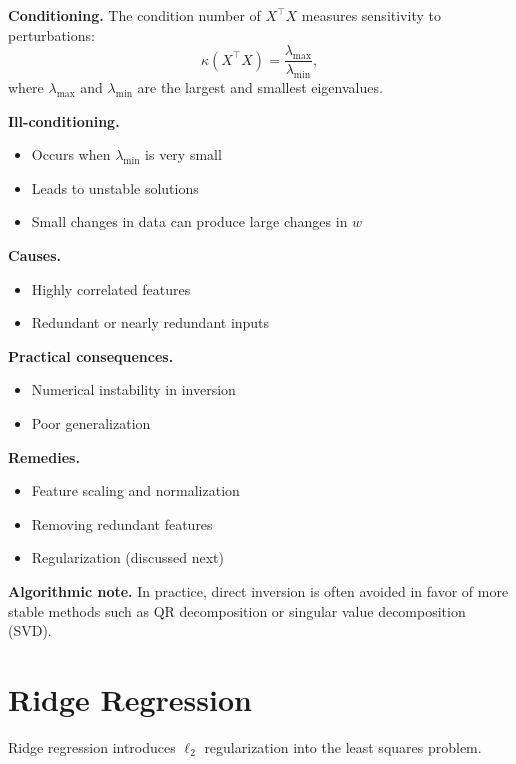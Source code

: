 \noindent
\textbf{Conditioning.}  
The condition number of $X^\top X$ measures sensitivity to perturbations:
\[
\kappa(X^\top X) = \frac{\lambda_{\max}}{\lambda_{\min}},
\]
where $\lambda_{\max}$ and $\lambda_{\min}$ are the largest and smallest eigenvalues.

\medskip

\noindent
\textbf{Ill-conditioning.}
\begin{itemize}
    \item Occurs when $\lambda_{\min}$ is very small
    \item Leads to unstable solutions
    \item Small changes in data can produce large changes in $w$
\end{itemize}

\medskip

\noindent
\textbf{Causes.}
\begin{itemize}
    \item Highly correlated features
    \item Redundant or nearly redundant inputs
\end{itemize}

\medskip

\noindent
\textbf{Practical consequences.}
\begin{itemize}
    \item Numerical instability in inversion
    \item Poor generalization
\end{itemize}

\medskip

\noindent
\textbf{Remedies.}
\begin{itemize}
    \item Feature scaling and normalization
    \item Removing redundant features
    \item Regularization (discussed next)
\end{itemize}

\medskip

\noindent
\textbf{Algorithmic note.}  
In practice, direct inversion is often avoided in favor of more stable methods such as QR decomposition or singular value decomposition (SVD).

\section{Ridge Regression}

Ridge regression introduces $\ell_2$ regularization into the least squares problem.

